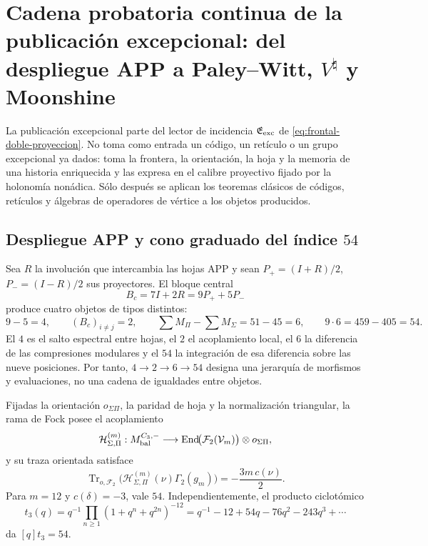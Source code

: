 \section{Cadena probatoria continua de la publicación excepcional: del despliegue APP a Paley--Witt,
\texorpdfstring{\(V^\natural\)}{V natural} y Moonshine}
\label{sec:prueba-corredor-excepcional}

La publicación excepcional parte del lector de incidencia
\(\mathfrak E_{\rm exc}\) de \eqref{eq:frontal-doble-proyeccion}. No toma como
entrada un código, un retículo o un grupo excepcional ya dados: toma la
frontera, la orientación, la hoja y la memoria de una historia enriquecida y
las expresa en el calibre proyectivo fijado por la holonomía nonádica. Sólo
después se aplican los teoremas clásicos de códigos, retículos y álgebras de
operadores de vértice a los objetos producidos.

\subsection{\texorpdfstring{Despliegue APP y cono graduado del índice \(54\)}{Despliegue APP y cono graduado del índice 54}}

Sea \(R\) la involución que intercambia las hojas APP y sean
\(P_+=(I+R)/2\), \(P_-=(I-R)/2\) sus proyectores. El bloque central
\begin{equation}
 B_c=7I+2R=9P_++5P_-
 \label{eq:exc-bloque-central-app}
\end{equation}
produce cuatro objetos de tipos distintos:
\begin{equation}
 9-5=4,\qquad (B_c)_{i\ne j}=2,\qquad
 \sum M_\Pi-\sum M_\Sigma=51-45=6,\qquad
 9\cdot6=459-405=54.
 \label{eq:exc-despliegue-42654}
\end{equation}
El \(4\) es el salto espectral entre hojas, el \(2\) el acoplamiento local,
el \(6\) la diferencia de las compresiones modulares y el \(54\) la
integración de esa diferencia sobre las nueve posiciones. Por tanto,
\(4\to2\to6\to54\) designa una jerarquía de morfismos y evaluaciones, no
una cadena de igualdades entre objetos.

Fijadas la orientación \(o_{\Sigma\Pi}\), la paridad de hoja y la
normalización triangular, la rama de Fock posee el acoplamiento
\begin{equation}
 \mathcal H_{\Sigma,\Pi}^{(m)}:
 M_{\rm bal}^{C_3,-}\longrightarrow
 \operatorname{End}\!\bigl(\mathcal F_2(\mathcal V_m)\bigr)
 \otimes o_{\Sigma\Pi},
 \label{eq:exc-acoplamiento-fock}
\end{equation}
y su traza orientada satisface
\begin{equation}
 \operatorname{Tr}_{o,\mathcal F_2}
 \bigl(\mathcal H_{\Sigma,\Pi}^{(m)}(\nu)\Gamma_2(g_m)\bigr)
 =-\frac{3m\,c(\nu)}2.
 \label{eq:exc-traza-fock}
\end{equation}
Para \(m=12\) y \(c(\delta)=-3\), vale \(54\). Independientemente, el
producto ciclotómico
\begin{equation}
 t_3(q)=q^{-1}\prod_{n\ge1}(1+q^n+q^{2n})^{-12}
 =q^{-1}-12+54q-76q^2-243q^3+\cdots
 \label{eq:exc-t3}
\end{equation}
da \([q]t_3=54\).

